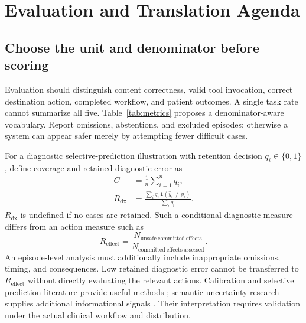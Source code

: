 \section{Evaluation and Translation Agenda}
\subsection{Choose the unit and denominator before scoring}
Evaluation should distinguish content correctness, valid tool invocation, correct destination action, completed workflow, and patient outcomes. A single task rate cannot summarize all five. Table~\ref{tab:metrics} proposes a denominator-aware vocabulary. Report omissions, abstentions, and excluded episodes; otherwise a system can appear safer merely by attempting fewer difficult cases.

For a diagnostic selective-prediction illustration with retention decision $q_i\in\{0,1\}$, define coverage and retained diagnostic error as
\begin{align}
C&=\frac{1}{n}\sum_{i=1}^{n}q_i,\\
R_{\mathrm{dx}}&=\frac{\sum_i q_i\,\mathbf{1}(\widehat{y}_i\ne y_i)}{\sum_i q_i}.
\end{align}
$R_{\mathrm{dx}}$ is undefined if no cases are retained. Such a conditional diagnostic measure differs from an action measure such as
\begin{equation}
R_{\mathrm{effect}}=\frac{N_{\mathrm{unsafe\ committed\ effects}}}{N_{\mathrm{committed\ effects\ assessed}}}.
\end{equation}
An episode-level analysis must additionally include inappropriate omissions, timing, and consequences. Low retained diagnostic error cannot be transferred to $R_{\mathrm{effect}}$ without directly evaluating the relevant actions. Calibration and selective prediction literature provide useful methods \cite{calibration2017,selective2017}; semantic uncertainty research supplies additional informational signals \cite{semanticentropy2024}. Their interpretation requires validation under the actual clinical workflow and distribution.

